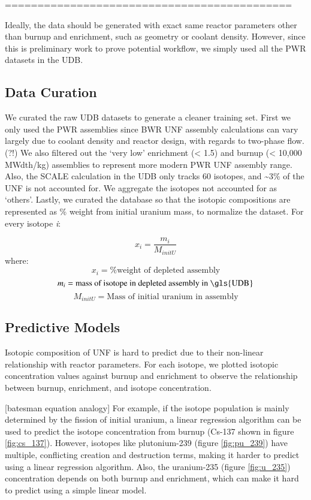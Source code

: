 ============================================

Ideally, the data should be generated with exact same reactor
parameters other than burnup and enrichment, such as geometry or
coolant density. However, since
this is preliminary work to prove potential workflow, we
simply used all the \gls{PWR} datasets in the \gls{UDB}.


\subsection{Data Curation}

We curated the raw \gls{UDB} datasets to generate
a cleaner training set. First we only used the 
\gls{PWR} assemblies since \gls{BWR} \gls{UNF} assembly
calculations can vary largely due to coolant density
and reactor design, with regards to two-phase flow. (?!)
We also filtered out the 
`very low' enrichment (< 1.5) and burnup (< 10,000 MWdth/kg)
assemblies to represent more modern \gls{PWR} \gls{UNF}
assembly range.
Also, the SCALE calculation in the \gls{UDB} only tracks 60 isotopes,
and \textasciitilde 3\% of the \gls{UNF} is not accounted for. We
aggregate the isotopes not accounted for as `others'. Lastly,
we curated the database so that the isotopic compositions are 
represented as \% weight from initial uranium mass, to normalize
the dataset. For every isotope \textit{i}:

\begin{equation}
x_i = \frac{m_i}{M_{initU}}
\end{equation}
where:
\[
x_i = \text{\% weight of depleted assembly}
\]
\[
m_i = \text{mass of isotope in depleted assembly in \gls{UDB}}
\]
\[
M_{initU} = \text{Mass of initial uranium in assembly}
\]


\subsection{Predictive Models}

Isotopic composition of \gls{UNF} is hard to predict due to their
non-linear relationship with reactor parameters. For each
isotope, we plotted isotopic concentration values against
burnup and enrichment to observe the relationship between
burnup, enrichment, and isotope concentration.

[batesman equation analogy]
For example, if the isotope population is mainly determined by
the fission of initial uranium, a linear regression algorithm
can be used to predict the isotope concentration from burnup
(Cs-137 shown in figure \ref{fig:cs_137}).
However, isotopes like plutonium-239 (figure \ref{fig:pu_239}) have multiple, conflicting creation
and destruction terms, making it harder to predict using a
linear regression algorithm. Also, the uranium-235 (figure \ref{fig:u_235}) concentration
depends on both burnup and enrichment, which can make it
hard to predict using a simple linear model.

